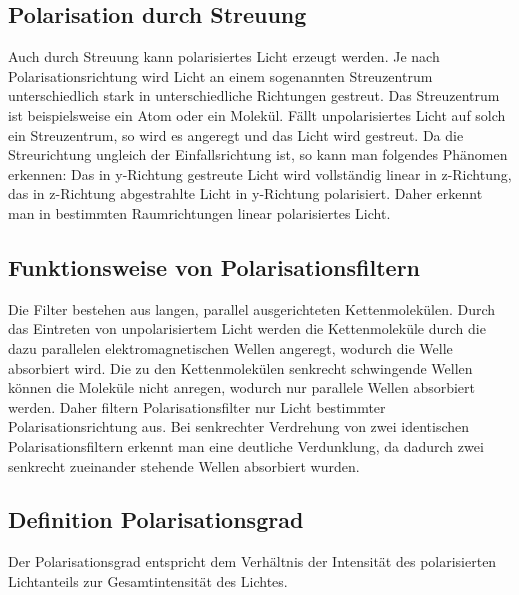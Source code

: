 \subsection*{Polarisation durch Streuung}
Auch durch Streuung kann polarisiertes Licht erzeugt werden. Je nach Polarisationsrichtung wird Licht an einem sogenannten Streuzentrum unterschiedlich stark in unterschiedliche Richtungen gestreut. Das Streuzentrum ist beispielsweise ein Atom oder ein Molekül. Fällt unpolarisiertes Licht auf solch ein Streuzentrum, so wird es angeregt und das Licht wird gestreut. Da die Streurichtung ungleich der Einfallsrichtung ist, so kann man folgendes Phänomen erkennen:  Das in y-Richtung gestreute Licht wird vollständig linear in z-Richtung, das in z-Richtung abgestrahlte Licht in y-Richtung polarisiert. Daher erkennt man in bestimmten Raumrichtungen linear polarisiertes Licht.

\subsection*{Funktionsweise von Polarisationsfiltern}
Die Filter bestehen aus langen, parallel ausgerichteten Kettenmolekülen. Durch das Eintreten von unpolarisiertem Licht werden die Kettenmoleküle durch die dazu parallelen elektromagnetischen Wellen angeregt, wodurch die Welle absorbiert wird. Die zu den Kettenmolekülen senkrecht schwingende Wellen können die Moleküle nicht anregen, wodurch nur parallele Wellen absorbiert werden. Daher filtern Polarisationsfilter nur Licht bestimmter Polarisationsrichtung aus. 
Bei senkrechter Verdrehung von zwei identischen Polarisationsfiltern erkennt man eine deutliche Verdunklung, da dadurch zwei senkrecht zueinander stehende Wellen absorbiert wurden. 

\subsection*{Definition Polarisationsgrad}
Der Polarisationsgrad entspricht dem Verhältnis der Intensität des polarisierten Lichtanteils zur Gesamtintensität des Lichtes.

